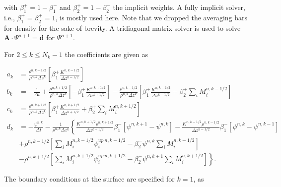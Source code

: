 \documentclass[dvipdfmx,a4paper,10pt]{article}
\begin{document}
with $\beta_1^+=1-\beta_1^-$ and $\beta_2^+=1-\beta_2^-$ the implicit weights. A fully implicit solver, i.e., $\beta_1^{+}=\beta_2^{+}=1$, is mostly used here. Note that we dropped the averaging bars for density for the sake of brevity. A tridiagonal matrix solver is used to solve $\mathbf{A}\cdot\Psi^{n+1}=\mathbf{d}$ for $\Psi^{n+1}$. 

\noindent For $2\leq k \leq N_k-1$ the coefficients are given as 

\begin{align*}
  a_k &=  \frac{\rho^{n,k-1/2}}{\rho^{n,k}\Delta z^k} \left[\beta_1^+ \frac{K^{n,k-1/2}}{\Delta z ^{k-1/2}}\right]\\
    b_k &= -\frac{1}{\Delta t} + \frac{\rho^{n,k+1/2}}{\rho^{n,k}\Delta z^k} \left[-\beta_1^+\frac{K^{n,k+1/2}}{\Delta z ^{k+1/2}} \right]-\frac{\rho^{n,k-1/2}}{\rho^{n,k}\Delta z^k} \left[\beta_1^+\frac{K^{n,k-1/2}}{\Delta z ^{k-1/2}}+\beta_2^+\sum_iM_i^{n,k-1/2} \right] \\
      c_k &= \frac{\rho^{n,k+1/2}}{\rho^{n,k}\Delta z^k}\left[\beta_1^+ \frac{K^{n,k+1/2}}{\Delta z ^{k+1/2}}+\beta_2^+\sum_iM_i^{n,k+1/2} \right] \\
      d_k &=-\frac{\psi^{n,k}}{\Delta t} - \frac{1}{\rho^{n,k}\Delta z^k} \left\{ \frac{K^{n,k+1/2}\rho^{n,k+1/2}}{\Delta z^{k+1/2}}\beta_1^{-}\left[\psi^{n,k+1} - \psi^{n,k}\right]-\frac{K^{n,k-1/2}\rho^{n,k-1/2}}{\Delta z^{k-1/2}}\beta_1^{-}\left[\psi^{n,k} - \psi^{n,k-1}\right]\right.   \\   
          & \left.+\rho^{n,k-1/2}\left[\sum_iM_i^{n,k-1/2}\psi_i^{up~n,k-1/2} - \beta_2^{-}\psi^{n,k}\sum_iM_i^{n,k-1/2} \right]\right.\\
          & \left. -\rho^{n,k+1/2}\left[\sum_iM_i^{n,k+1/2}\psi_i^{up~n,k+1/2} - \beta_2^{-}\psi^{n,k+1}\sum_iM_i^{n,k+1/2} \right] \right\}.
\end{align*}

\noindent The boundary conditions at the surface are specified for $k=1$, as
\end{document}
